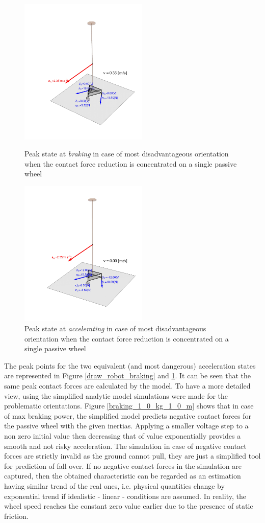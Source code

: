 \documentclass[12pt,english,twoside]{article}
\begin{document}
\begin{figure}[htb!]
	\centering
	\includegraphics[height=7cm]{figures/draw_robot_baking}
	\caption{Peak state at \textit{braking} in case of most disadvantageous orientation when the contact force reduction is concentrated on a single passive wheel}
	\label{draw_robot_braking}
	\endminipage\hfill
	\centering
	\includegraphics[height=7cm]{figures/draw_robot_accelerating}
	\caption{Peak state at \textit{accelerating} in case of most disadvantageous orientation when the contact force reduction is concentrated on a single passive wheel}
	\label{draw_robot_accelerate}
	\endminipage\hfill
\end{figure}
The peak points for the two equivalent (and most dangerous) acceleration states are represented in Figure \ref{draw_robot_braking} and \ref{draw_robot_accelerate}. It can be seen that the same peak contact forces are calculated by the model. To have a more detailed view, using the simplified analytic model simulations were made for the problematic orientations.
Figure \ref{braking_1_0_kg_1_0_m} shows that in case of max braking power, the simplified model predicts negative contact forces for the passive wheel with the given inertias. Applying a smaller voltage step to a non zero initial value then decreasing that of value exponentially provides a smooth and not risky acceleration. The simulation in case of negative contact forces are strictly invalid as the ground cannot pull, they are just a simplified tool for prediction of fall over. If no negative contact forces in the simulation are captured, then the obtained characteristic can be regarded as an estimation having similar trend of the real ones, i.e. physical quantities change by exponential trend if idealistic - linear - conditions are assumed. In reality, the wheel speed reaches the constant zero value earlier due to the presence of static friction.
\end{document}
